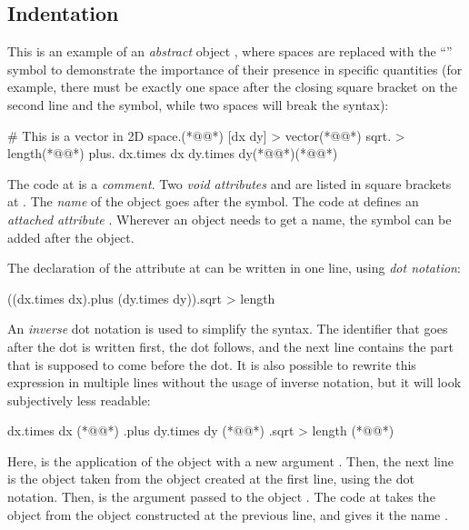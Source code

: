 \subsection{Indentation}

This is an example of an \emph{abstract} object , where
spaces are replaced with the ``\textvisiblespace'' symbol to demonstrate
the importance of their presence in specific quantities
(for example, there must be exactly one space after the closing square bracket on the
second line and the \ff{>} symbol, while two spaces will break the syntax):

{\lstset{showspaces=true}\begin{ffcode}
# This is a vector in 2D space.(*@\label{ln:comment}@*)
[dx dy] > vector(*@\label{ln:vector}@*)
  sqrt. > length(*@\label{ln:length}@*)
    plus.
      dx.times dx
      dy.times dy(*@\label{ln:length-end}@*)(*@\label{ln:vector-end}@*)
\end{ffcode}
}

The code at  is a \emph{comment}.
Two \emph{void attributes}  and 
are listed in square brackets at .
The \emph{name} of the object goes after the \ff{>} symbol.
The code at  defines
an \emph{attached attribute} . Wherever an object
needs to get a name, the \ff{>} symbol can be added after the object.

The declaration of the attribute  at 
can be written in one line, using \emph{dot notation}:

\begin{ffcode}
((dx.times dx).plus (dy.times dy)).sqrt > length
\end{ffcode}

An \emph{inverse} dot notation is used to simplify
the syntax. The identifier that goes after the dot is written
first, the dot follows, and the next line contains the part
that is supposed to come before the dot. It is also possible to rewrite
this expression in multiple lines without the usage of
inverse notation, but it will look subjectively less readable:

\begin{ffcode}
dx.times dx (*@\label{ln:dx-pow}@*)
.plus
  dy.times dy (*@\label{ln:dx-pow-2}@*)
.sqrt > length (*@\label{ln:dx-pow-3}@*)
\end{ffcode}

Here,  is the application of the object  with
a new argument . Then, the next line is the object  taken
from the object created at the first line, using the dot notation. Then,
 is the argument passed to the object .
The code at  takes the object  from the object constructed
at the previous line, and gives it the name .

